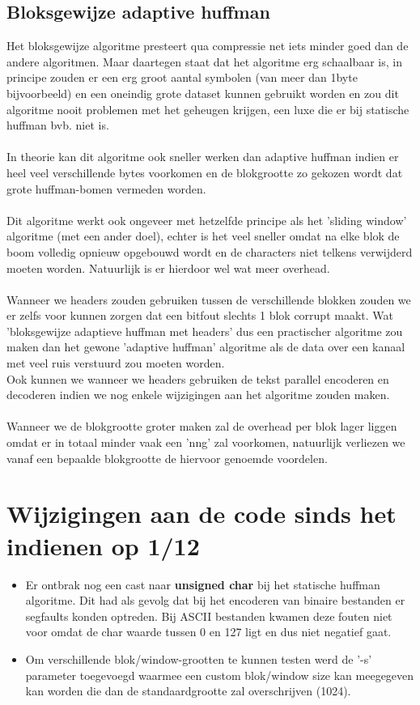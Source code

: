 \documentclass[a4paper,12pt]{report}
\begin{document}
\section{Bloksgewijze adaptive huffman}
Het bloksgewijze algoritme presteert qua compressie net iets minder goed dan de andere algoritmen. Maar daartegen staat dat het algoritme erg schaalbaar is, in principe zouden er een erg groot aantal symbolen (van meer dan 1byte bijvoorbeeld) en een oneindig grote dataset kunnen gebruikt worden en zou dit algoritme nooit problemen met het geheugen krijgen, een luxe die er bij statische huffman bvb. niet is. \\ \\
In theorie kan dit algoritme ook sneller werken dan adaptive huffman indien er heel veel verschillende bytes voorkomen en de blokgrootte zo gekozen wordt dat grote huffman-bomen vermeden worden. \\ \\
Dit algoritme werkt ook ongeveer met hetzelfde principe als het 'sliding window' algoritme (met een ander doel), echter is het veel sneller omdat na elke blok de boom volledig opnieuw opgebouwd wordt en de characters niet telkens verwijderd moeten worden. Natuurlijk is er hierdoor wel wat meer overhead. \\ \\ 
Wanneer we headers zouden gebruiken tussen de verschillende blokken zouden we er zelfs voor kunnen zorgen dat een bitfout slechts 1 blok corrupt maakt. Wat 'bloksgewijze adaptieve huffman met headers' dus een practischer algoritme zou maken dan het gewone 'adaptive huffman' algoritme als de data over een kanaal met veel ruis verstuurd zou moeten worden. \\ 
Ook kunnen we wanneer we headers gebruiken de tekst parallel encoderen en decoderen indien we nog enkele wijzigingen aan het algoritme zouden maken.\\ \\
Wanneer we de blokgrootte groter maken zal de overhead per blok lager liggen omdat er in totaal minder vaak een 'nng' zal voorkomen, natuurlijk verliezen we vanaf een bepaalde blokgrootte de hiervoor genoemde voordelen.

\chapter{Wijzigingen aan de code sinds het indienen op 1/12}
\begin{itemize}
	\item Er ontbrak nog een cast naar \textbf{unsigned char} bij het statische huffman algoritme. Dit had als gevolg dat bij het encoderen van binaire bestanden er segfaults konden optreden. Bij ASCII bestanden kwamen deze fouten niet voor omdat de char waarde tussen 0 en 127 ligt en dus niet negatief gaat.
	\item Om verschillende blok/window-grootten te kunnen testen werd de '-s' parameter toegevoegd waarmee een custom blok/window size kan meegegeven kan worden die dan de standaardgrootte zal overschrijven (1024).
\end{itemize}
\end{document}
